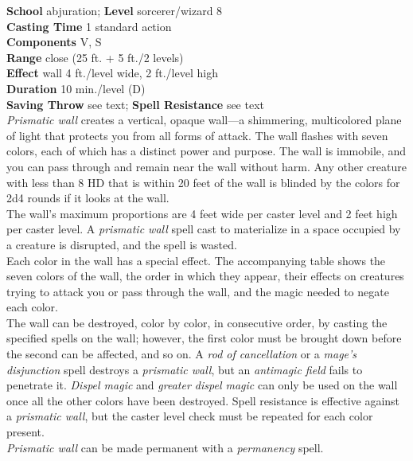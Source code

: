 \textbf{School} abjuration; \textbf{Level} sorcerer/wizard 8\\
\textbf{Casting Time} 1 standard action\\
\textbf{Components} V, S\\
\textbf{Range} close (25 ft. + 5 ft./2 levels)\\
\textbf{Effect }wall 4 ft./level wide, 2 ft./level high\\
\textbf{Duration} 10 min./level (D)\\
\textbf{Saving Throw} see text; \textbf{Spell Resistance} see text\\
\textit{Prismatic wall }creates a vertical, opaque wall—a shimmering, multicolored plane of light that protects you from all forms of attack. The wall flashes with seven colors, each of which has a distinct power and purpose. The wall is immobile, and you can pass through and remain near the wall without harm. Any other creature with less than 8 HD that is within 20 feet of the wall is blinded by the colors for 2d4 rounds if it looks at the wall.\\
The wall's maximum proportions are 4 feet wide per caster level and 2 feet high per caster level. A \textit{prismatic wall }spell cast to materialize in a space occupied by a creature is disrupted, and the spell is wasted.\\
Each color in the wall has a special effect. The accompanying table shows the seven colors of the wall, the order in which they appear, their effects on creatures trying to attack you or pass through the wall, and the magic needed to negate each color.\\
The wall can be destroyed, color by color, in consecutive order, by casting the specified spells on the wall; however, the first color must be brought down before the second can be affected, and so on. A \textit{rod of cancellation }or a \textit{mage's disjunction }spell destroys a \textit{prismatic wall}, but an \textit{antimagic field }fails to penetrate it. \textit{Dispel magic }and \textit{greater dispel magic }can only be used on the wall once all the other colors have been destroyed. Spell resistance is effective against a \textit{prismatic wall}, but the caster level check must be repeated for each color present.\\
\textit{Prismatic wall }can be made permanent with a \textit{permanency }spell.\\
